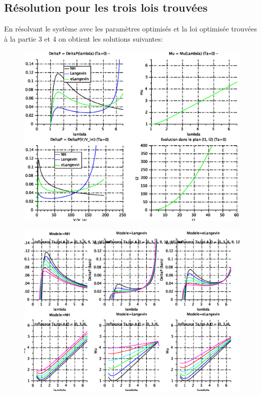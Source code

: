 \documentclass[a4paper,11pt]{article}
\begin{document}
\subsection{Résolution pour les trois lois trouvées}
En résolvant le système avec les paramètres optimisés et la loi optimisée trouvées à la partie 3 et 4 on obtient les solutions suivantes: 
\begin{figure}[!ht]
\centering\includegraphics[scale=0.75]{scilab/q531.eps}
\end{figure}
\begin{figure}[!ht]
\centering\includegraphics[scale=0.75]{scilab/q532.eps}
\end{figure}

\end{document}
